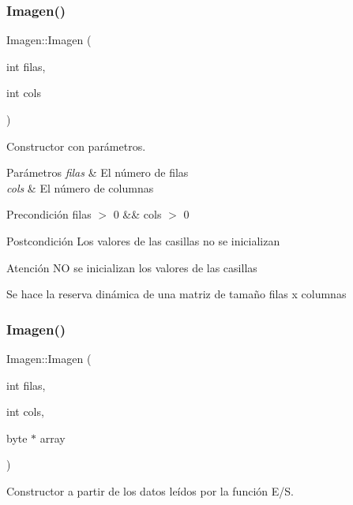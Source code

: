 \subsubsection{\texorpdfstring{Imagen()}{Imagen()}\hspace{0.1cm}{\footnotesize\ttfamily [3/4]}}
{\footnotesize\ttfamily Imagen\+::\+Imagen (\begin{DoxyParamCaption}\item[{int}]{filas,  }\item[{int}]{cols }\end{DoxyParamCaption})}



Constructor con parámetros. 


\begin{DoxyParams}{Parámetros}
{\em filas} & El número de filas \\
\hline
{\em cols} & El número de columnas \\
\hline
\end{DoxyParams}
\begin{DoxyPrecond}{Precondición}
filas $>$ 0 \&\& cols $>$ 0 
\end{DoxyPrecond}
\begin{DoxyPostcond}{Postcondición}
Los valores de las casillas no se inicializan 
\end{DoxyPostcond}
\begin{DoxyWarning}{Atención}
NO se inicializan los valores de las casillas
\end{DoxyWarning}
Se hace la reserva dinámica de una matriz de tamaño filas x columnas \mbox{\label{classImagen_a9630d5a1b9896c9b132a76e8015c1ed2}} 
\subsubsection{\texorpdfstring{Imagen()}{Imagen()}\hspace{0.1cm}{\footnotesize\ttfamily [4/4]}}
{\footnotesize\ttfamily Imagen\+::\+Imagen (\begin{DoxyParamCaption}\item[{int}]{filas,  }\item[{int}]{cols,  }\item[{byte $\ast$}]{array }\end{DoxyParamCaption})}



Constructor a partir de los datos leídos por la función E/S. 


